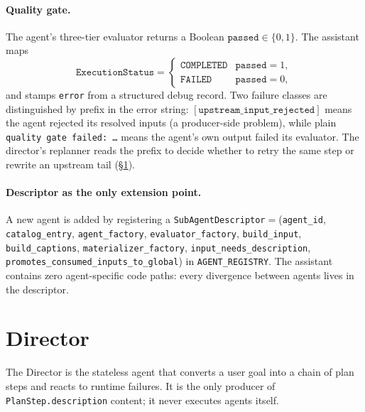 \paragraph{Quality gate.}
The agent's three-tier evaluator returns a Boolean
$\texttt{passed}\!\in\!\{0,1\}$. The assistant maps
\begin{equation*}
\texttt{ExecutionStatus}=
\begin{cases}
\texttt{COMPLETED} & \texttt{passed}=1, \\
\texttt{FAILED} & \texttt{passed}=0,
\end{cases}
\end{equation*}
and stamps \texttt{error} from a structured debug record. Two failure
classes are distinguished by prefix in the error string:
$[\texttt{upstream\_input\_rejected}]$ means the agent rejected its
resolved inputs (a producer-side problem), while plain
\texttt{quality gate failed: \dots} means the agent's own output failed
its evaluator. The director's replanner reads the prefix to decide
whether to retry the same step or rewrite an upstream tail
(\S\ref{sec:director}).

\paragraph{Descriptor as the only extension point.}
A new agent is added by registering a
\texttt{SubAgentDescriptor}$=$(\texttt{agent\_id},
\texttt{catalog\_entry}, \texttt{agent\_factory},
\texttt{evaluator\_factory}, \texttt{build\_input},
\texttt{build\_captions}, \texttt{materializer\_factory},
\texttt{input\_needs\_description}, \texttt{promotes\_consumed\_inputs\_to\_global})
in \texttt{AGENT\_REGISTRY}. The assistant contains zero
agent-specific code paths: every divergence between agents lives in the
descriptor.


\section{Director}
\label{sec:director}

The Director is the stateless agent that converts a user goal into a
chain of plan steps and reacts to runtime failures. It is the only
producer of \texttt{PlanStep.description} content; it never executes
agents itself.

